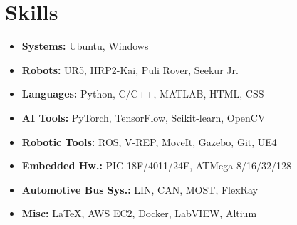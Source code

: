 \documentclass[10pt, oneside]{article} %
\begin{document}
\begin{paracol}{2}
\begin{itemize}[leftmargin=*, topsep=0pt, label={}]
\end{itemize}



\section{Skills}

\begin{itemize}[leftmargin=*, topsep=0pt, label={}]
	\item{\textbf{Systems:} Ubuntu, Windows}
	\item{\textbf{Robots:} UR5, HRP2-Kai, Puli Rover, Seekur Jr.}
	\item{\textbf{Languages:} Python, C/C++, MATLAB, HTML, CSS}
	\item{\textbf{AI Tools:} PyTorch, TensorFlow, Scikit-learn, OpenCV} %
	\item{\textbf{Robotic Tools:} ROS, V-REP, MoveIt, Gazebo, Git, UE4}
	\item{\textbf{Embedded Hw.:} PIC 18F/4011/24F, ATMega 8/16/32/128}
    \item{\textbf{Automotive Bus Sys.:} LIN, CAN, MOST, FlexRay}
    \item{\textbf{Misc:} \LaTeX, AWS EC2, Docker, LabVIEW, Altium}
    
\end{itemize}





\end{paracol}
\end{document}

